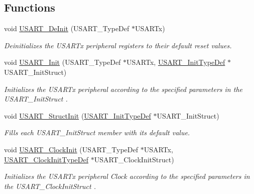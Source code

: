 \subsection*{Functions}
\begin{DoxyCompactItemize}
\item 
void \mbox{\hyperlink{group___u_s_a_r_t_ga2f8e1ce72da21b6539d8e1f299ec3b0d}{U\+S\+A\+R\+T\+\_\+\+De\+Init}} (U\+S\+A\+R\+T\+\_\+\+Type\+Def $\ast$U\+S\+A\+R\+Tx)
\begin{DoxyCompactList}\small\item\em Deinitializes the U\+S\+A\+R\+Tx peripheral registers to their default reset values. \end{DoxyCompactList}\item 
void \mbox{\hyperlink{group___u_s_a_r_t_ga98da340ea0324002ba1b4263e91ab2ff}{U\+S\+A\+R\+T\+\_\+\+Init}} (U\+S\+A\+R\+T\+\_\+\+Type\+Def $\ast$U\+S\+A\+R\+Tx, \mbox{\hyperlink{struct_u_s_a_r_t___init_type_def}{U\+S\+A\+R\+T\+\_\+\+Init\+Type\+Def}} $\ast$U\+S\+A\+R\+T\+\_\+\+Init\+Struct)
\begin{DoxyCompactList}\small\item\em Initializes the U\+S\+A\+R\+Tx peripheral according to the specified parameters in the U\+S\+A\+R\+T\+\_\+\+Init\+Struct . \end{DoxyCompactList}\item 
void \mbox{\hyperlink{group___u_s_a_r_t_ga34e1faa2f312496c16cfd05155f4c8b1}{U\+S\+A\+R\+T\+\_\+\+Struct\+Init}} (\mbox{\hyperlink{struct_u_s_a_r_t___init_type_def}{U\+S\+A\+R\+T\+\_\+\+Init\+Type\+Def}} $\ast$U\+S\+A\+R\+T\+\_\+\+Init\+Struct)
\begin{DoxyCompactList}\small\item\em Fills each U\+S\+A\+R\+T\+\_\+\+Init\+Struct member with its default value. \end{DoxyCompactList}\item 
void \mbox{\hyperlink{group___u_s_a_r_t_gadb50c7a2175c91acd3728f8eefd0c63d}{U\+S\+A\+R\+T\+\_\+\+Clock\+Init}} (U\+S\+A\+R\+T\+\_\+\+Type\+Def $\ast$U\+S\+A\+R\+Tx, \mbox{\hyperlink{struct_u_s_a_r_t___clock_init_type_def}{U\+S\+A\+R\+T\+\_\+\+Clock\+Init\+Type\+Def}} $\ast$U\+S\+A\+R\+T\+\_\+\+Clock\+Init\+Struct)
\begin{DoxyCompactList}\small\item\em Initializes the U\+S\+A\+R\+Tx peripheral Clock according to the specified parameters in the U\+S\+A\+R\+T\+\_\+\+Clock\+Init\+Struct . \end{DoxyCompactList}\item 

\end{DoxyCompactItemize}
